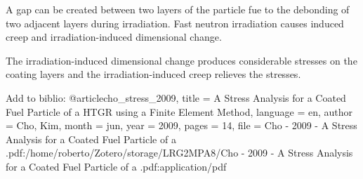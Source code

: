 A gap can be created between two layers of the particle fue to the debonding of two adjacent layers during irradiation.
Fast neutron irradiation causes induced creep and irradiation-induced dimensional change.

The irradiation-induced dimensional change produces considerable stresses on the coating layers and the irradiation-induced creep relieves the stresses.

\cite{cho_stress_2009}

Add to biblio:
@article{cho_stress_2009,
	title = {A {Stress} {Analysis} for a {Coated} {Fuel} {Particle} of a {HTGR} using a {Finite} {Element} {Method}},
	language = {en},
	author = {Cho, Kim},
	month = jun,
	year = {2009},
	pages = {14},
	file = {Cho - 2009 - A Stress Analysis for a Coated Fuel Particle of a .pdf:/home/roberto/Zotero/storage/LRG2MPA8/Cho - 2009 - A Stress Analysis for a Coated Fuel Particle of a .pdf:application/pdf}
}